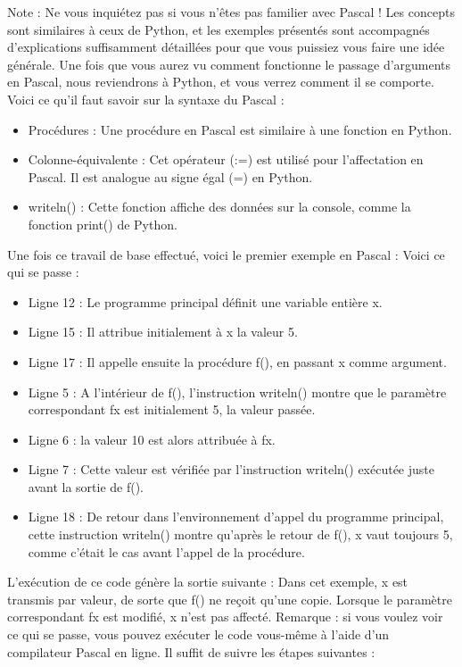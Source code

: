 Note : Ne vous inquiétez pas si vous n'êtes pas familier avec Pascal !  Les concepts sont similaires à ceux de Python, et les exemples présentés sont accompagnés d'explications suffisamment détaillées pour que vous puissiez vous faire une idée générale.  Une fois que vous aurez vu comment fonctionne le passage d'arguments en Pascal, nous reviendrons à Python, et vous verrez comment il se comporte.
Voici ce qu'il faut savoir sur la syntaxe du Pascal :
\begin{itemize}
\item Procédures : Une procédure en Pascal est similaire à une fonction en Python.
\item Colonne-équivalente : Cet opérateur (:=) est utilisé pour l'affectation en Pascal. Il est analogue au signe égal (=) en Python.
\item writeln() : Cette fonction affiche des données sur la console, comme la fonction print() de Python.
\end{itemize}
Une fois ce travail de base effectué, voici le premier exemple en Pascal :
Voici ce qui se passe :
\begin{itemize}
\item Ligne 12 : Le programme principal définit une variable entière x.
\item Ligne 15 : Il attribue initialement à x la valeur 5.
\item Ligne 17 : Il appelle ensuite la procédure f(), en passant x comme argument.
\item Ligne 5 : A l'intérieur de f(), l'instruction writeln() montre que le paramètre correspondant fx est initialement 5, la valeur passée.
\item Ligne 6 : la valeur 10 est alors attribuée à fx.
\item Ligne 7 : Cette valeur est vérifiée par l'instruction writeln() exécutée juste avant la sortie de f().
\item Ligne 18 : De retour dans l'environnement d'appel du programme principal, cette instruction writeln() montre qu'après le retour de f(), x vaut toujours 5, comme c'était le cas avant l'appel de la procédure.
\end{itemize}
L'exécution de ce code génère la sortie suivante :
Dans cet exemple, x est transmis par valeur, de sorte que f() ne reçoit qu'une copie.  Lorsque le paramètre correspondant fx est modifié, x n'est pas affecté.
Remarque : si vous voulez voir ce qui se passe, vous pouvez exécuter le code vous-même à l'aide d'un compilateur Pascal en ligne.
Il suffit de suivre les étapes suivantes :
